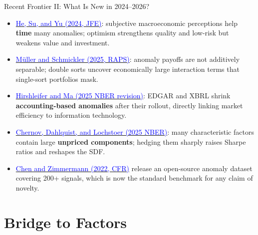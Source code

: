 \documentclass{beamer}
\begin{document}
\begin{frame}{Recent Frontier II: What Is New in 2024--2026?}
	\begin{itemize}
		\item \href{https://doi.org/10.1016/j.jfineco.2024.103952}{\textcolor{blue}{He, Su, and Yu (2024, JFE)}}: subjective macroeconomic perceptions help \textbf{time} many anomalies; optimism strengthens quality and low-risk but weakens value and investment.
		\item \href{https://doi.org/10.1093/rapstu/raaf001}{\textcolor{blue}{M\"uller and Schmickler (2025, RAPS)}}: anomaly payoffs are not additively separable; double sorts uncover economically large interaction terms that single-sort portfolios mask.
		\item \href{https://www.nber.org/papers/w32767}{\textcolor{blue}{Hirshleifer and Ma (2025 NBER revision)}}: EDGAR and XBRL shrink \textbf{accounting-based anomalies} after their rollout, directly linking market efficiency to information technology.
		\item \href{https://www.nber.org/papers/w34009}{\textcolor{blue}{Chernov, Dahlquist, and Lochstoer (2025 NBER)}}: many characteristic factors contain large \textbf{unpriced components}; hedging them sharply raises Sharpe ratios and reshapes the SDF.
		\item \href{https://doi.org/10.1561/104.00000112}{\textcolor{blue}{Chen and Zimmermann (2022, CFR)}} release an open-source anomaly dataset covering 200+ signals, which is now the standard benchmark for any claim of novelty.
	\end{itemize}
\end{frame}

\section{Bridge to Factors}
\end{document}
